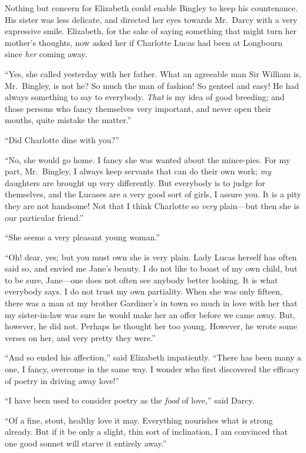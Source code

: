 Nothing but concern for Elizabeth could enable Bingley to keep
his countenance.  His sister was less delicate, and directed her
eyes towards Mr.\ Darcy with a very expressive smile.  Elizabeth,
for the sake of saying something that might turn her mother's
thoughts, now asked her if Charlotte Lucas had been at
Longbourn since \emph{her} coming away.

``Yes, she called yesterday with her father.  What an agreeable
man Sir William is, Mr.\ Bingley, is not he?  So much the man of
fashion!  So genteel and easy!  He had always something to say
to everybody.  \emph{That} is my idea of good breeding; and those
persons who fancy themselves very important, and never open
their mouths, quite mistake the matter.''

``Did Charlotte dine with you?''

``No, she would go home.  I fancy she was wanted about the
mince-pies.  For my part, Mr.\ Bingley, I always keep servants
that can do their own work; \emph{my} daughters are brought up very
differently.  But everybody is to judge for themselves, and the
Lucases are a very good sort of girls, I assure you.  It is a pity
they are not handsome!  Not that I think Charlotte so \emph{very}
plain---but then she is our particular friend.''

``She seems a very pleasant young woman.''

``Oh! dear, yes; but you must own she is very plain.  Lady Lucas
herself has often said so, and envied me Jane's beauty.  I do not
like to boast of my own child, but to be sure, Jane---one does
not often see anybody better looking.  It is what everybody says.
I do not trust my own partiality.  When she was only fifteen,
there was a man at my brother Gardiner's in town so much in
love with her that my sister-in-law was sure he would make her
an offer before we came away.  But, however, he did not.
Perhaps he thought her too young.  However, he wrote some
verses on her, and very pretty they were.''

``And so ended his affection,'' said Elizabeth impatiently.  ``There
has been many a one, I fancy, overcome in the same way.  I
wonder who first discovered the efficacy of poetry in driving
away love!''

``I have been used to consider poetry as the \emph{food} of love,'' said
Darcy.

``Of  a fine, stout, healthy love it may.  Everything nourishes
what is strong already.  But if it be only a slight, thin sort of
inclination, I am convinced that one good sonnet will starve it
entirely away.''


